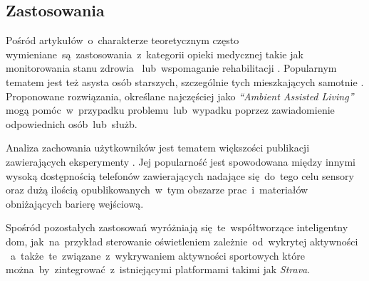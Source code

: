 \subsection{Zastosowania}
Pośród artykułów~o~charakterze teoretycznym często wymieniane~są~zastosowania~z~kategorii opieki medycznej takie jak monitorowania stanu zdrowia \cite{S22}~lub~wspomaganie rehabilitacji \cite{S35}. Popularnym tematem jest też asysta osób starszych, szczególnie tych mieszkających samotnie \cite{S21}. Proponowane rozwiązania, określane najczęściej jako \textit{``Ambient Assisted Living''} mogą pomóc~w~przypadku problemu~lub~wypadku poprzez zawiadomienie odpowiednich osób~lub~służb.

Analiza zachowania użytkowników jest tematem większości publikacji zawierających eksperymenty \cite{S02, S59, S33}. Jej popularność jest spowodowana między innymi wysoką dostępnością telefonów zawierających nadające się~do~tego celu sensory oraz dużą ilością opublikowanych~w~tym obszarze prac~i~materiałów obniżających barierę wejściową.

Spośród pozostałych zastosowań wyróżniają się~te~współtworzące inteligentny dom, jak~na~przykład sterowanie oświetleniem zależnie~od~wykrytej aktywności \cite{S36}~a~także~te~związane~z~wykrywaniem aktywności sportowych \cite{S29} które można~by~zintegrować~z~istniejącymi platformami takimi jak \textit{Strava}.


